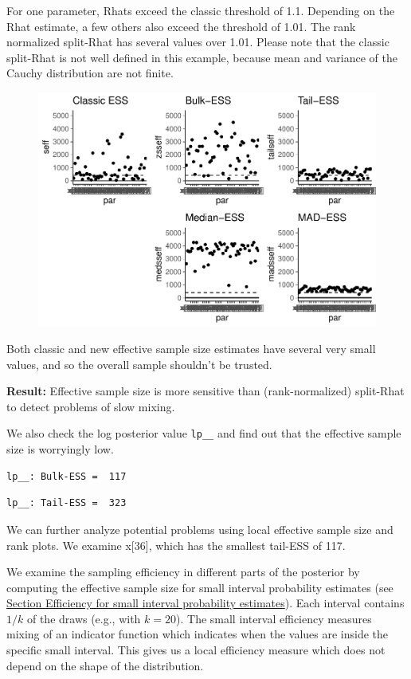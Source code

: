 \documentclass[american,]{article}
\begin{document}
For one parameter, Rhats exceed the classic threshold of 1.1. Depending
on the Rhat estimate, a few others also exceed the threshold of 1.01.
The rank normalized split-Rhat has several values over 1.01. Please note
that the classic split-Rhat is not well defined in this example, because
mean and variance of the Cauchy distribution are not finite.

\begin{figure}[tp]
  \centering
  \includegraphics[width=0.6\linewidth]{graphics/ess-fit-nom-1.pdf}
\end{figure}

Both classic and new effective sample size estimates have several very
small values, and so the overall sample shouldn't be trusted.

\textbf{Result:} Effective sample size is more sensitive than
(rank-normalized) split-Rhat to detect problems of slow mixing.

We also check the log posterior value \texttt{lp\_\_} and find out that
the effective sample size is worryingly low.

\begin{verbatim}
lp__: Bulk-ESS =  117
\end{verbatim}

\begin{verbatim}
lp__: Tail-ESS =  323
\end{verbatim}

We can further analyze potential problems using local effective sample
size and rank plots. We examine x{[}36{]}, which has the smallest
tail-ESS of 117.

We examine the sampling efficiency in different parts of the posterior
by computing the effective sample size for small interval probability
estimates (see \protect\hyperlink{small_interval_S_eff}{Section
Efficiency for small interval probability estimates}). Each interval
contains \(1/k\) of the draws (e.g., with \(k=20\)). The small interval
efficiency measures mixing of an indicator function which indicates when
the values are inside the specific small interval. This gives us a local
efficiency measure which does not depend on the shape of the
distribution.
\end{document}
